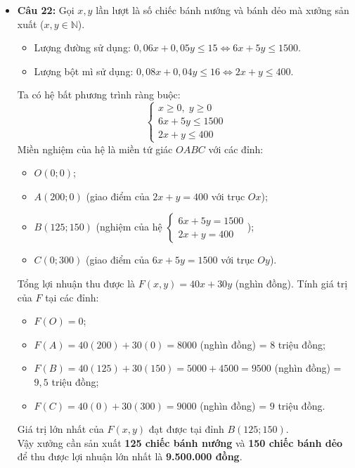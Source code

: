 \documentclass[12pt,a4paper]{article}
\begin{document}
\begin{itemize}[leftmargin=0.6cm, itemsep=4pt]
    \item \textbf{Câu 22:}
    Gọi $x, y$ lần lượt là số chiếc bánh nướng và bánh dẻo mà xưởng sản xuất ($x, y \in \mathbb{N}$).
    \begin{itemize}
        \item Lượng đường sử dụng: $0{,}06x + 0{,}05y \le 15 \iff 6x + 5y \le 1500$.
        \item Lượng bột mì sử dụng: $0{,}08x + 0{,}04y \le 16 \iff 2x + y \le 400$.
    \end{itemize}
    Ta có hệ bất phương trình ràng buộc:
    \[
    \begin{cases}
    x \ge 0,\; y \ge 0 \\
    6x + 5y \le 1500 \\
    2x + y \le 400
    \end{cases}
    \]
    Miền nghiệm của hệ là miền tứ giác $OABC$ với các đỉnh:
    \begin{itemize}
        \item $O(0; 0)$;
        \item $A(200; 0)$ (giao điểm của $2x + y = 400$ với trục $Ox$);
        \item $B(125; 150)$ (nghiệm của hệ $\begin{cases} 6x + 5y = 1500 \\ 2x + y = 400 \end{cases}$);
        \item $C(0; 300)$ (giao điểm của $6x + 5y = 1500$ với trục $Oy$).
    \end{itemize}
    Tổng lợi nhuận thu được là $F(x, y) = 40x + 30y$ (nghìn đồng). Tính giá trị của $F$ tại các đỉnh:
    \begin{itemize}
        \item $F(O) = 0$;
        \item $F(A) = 40(200) + 30(0) = 8000$ (nghìn đồng) = $8$ triệu đồng;
        \item $F(B) = 40(125) + 30(150) = 5000 + 4500 = 9500$ (nghìn đồng) = $9{,}5$ triệu đồng;
        \item $F(C) = 40(0) + 30(300) = 9000$ (nghìn đồng) = $9$ triệu đồng.
    \end{itemize}
    Giá trị lớn nhất của $F(x, y)$ đạt được tại đỉnh $B(125; 150)$.\\
    Vậy xưởng cần sản xuất \textbf{125 chiếc bánh nướng} và \textbf{150 chiếc bánh dẻo} để thu được lợi nhuận lớn nhất là \textbf{9.500.000 đồng}.
\end{itemize}
\end{document}
